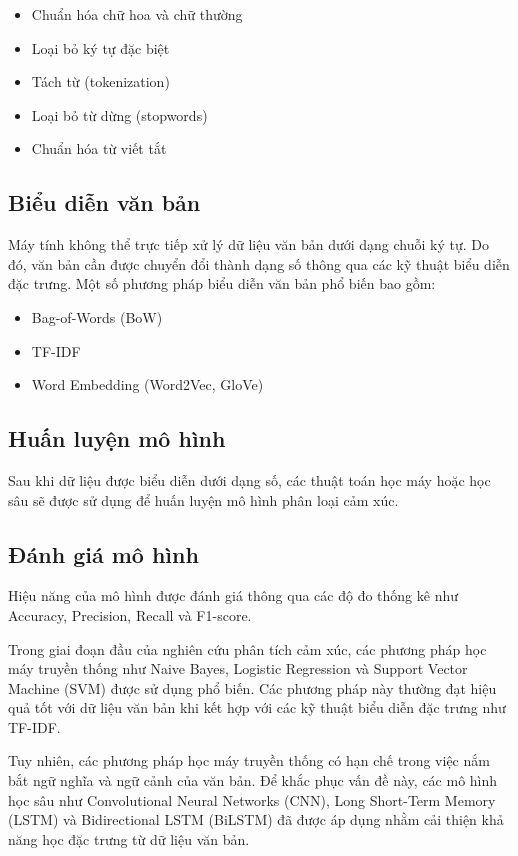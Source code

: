 \documentclass[14pt, a4paper]{report}
\begin{document}
\begin{itemize}
    \item Chuẩn hóa chữ hoa và chữ thường
    \item Loại bỏ ký tự đặc biệt
    \item Tách từ (tokenization)
    \item Loại bỏ từ dừng (stopwords)
    \item Chuẩn hóa từ viết tắt
\end{itemize}

\subsection{Biểu diễn văn bản}

Máy tính không thể trực tiếp xử lý dữ liệu văn bản dưới dạng chuỗi ký tự. Do đó, văn bản cần được chuyển đổi thành dạng số thông qua các kỹ thuật biểu diễn đặc trưng. Một số phương pháp biểu diễn văn bản phổ biến bao gồm:

\begin{itemize}
    \item Bag-of-Words (BoW)
    \item TF-IDF
    \item Word Embedding (Word2Vec, GloVe)
\end{itemize}

\subsection{Huấn luyện mô hình}

Sau khi dữ liệu được biểu diễn dưới dạng số, các thuật toán học máy hoặc học sâu sẽ được sử dụng để huấn luyện mô hình phân loại cảm xúc.

\subsection{Đánh giá mô hình}

Hiệu năng của mô hình được đánh giá thông qua các độ đo thống kê như Accuracy, Precision, Recall và F1-score.

Trong giai đoạn đầu của nghiên cứu phân tích cảm xúc, các phương pháp học máy truyền thống như Naive Bayes, Logistic Regression và Support Vector Machine (SVM) được sử dụng phổ biến. Các phương pháp này thường đạt hiệu quả tốt với dữ liệu văn bản khi kết hợp với các kỹ thuật biểu diễn đặc trưng như TF-IDF.

Tuy nhiên, các phương pháp học máy truyền thống có hạn chế trong việc nắm bắt ngữ nghĩa và ngữ cảnh của văn bản. Để khắc phục vấn đề này, các mô hình học sâu như Convolutional Neural Networks (CNN), Long Short-Term Memory (LSTM) và Bidirectional LSTM (BiLSTM) đã được áp dụng nhằm cải thiện khả năng học đặc trưng từ dữ liệu văn bản.
\end{document}
